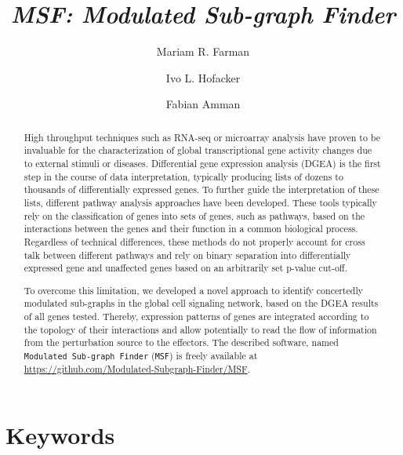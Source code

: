 \documentclass[10pt,a4paper,twocolumn]{article}
\begin{document}
\title{\textit{MSF: Modulated Sub-graph Finder} }

\author[1]{Mariam R. Farman}
\author[1]{Ivo L. Hofacker}
\author[1,2]{Fabian Amman}



\maketitle
\thispagestyle{fancy}

\begin{abstract}

High throughput techniques such as RNA-seq or microarray analysis have
proven to be invaluable for the characterization of global transcriptional
gene activity changes due to external stimuli or diseases. Differential
gene expression analysis (DGEA) is the first step in the course of data
interpretation, typically producing lists of dozens to thousands of
differentially expressed genes. To further guide the interpretation of
these lists, different pathway analysis approaches have been
developed. These tools typically rely on the classification of genes into
sets of genes, such as pathways, based on the interactions between the genes
and their function in a common biological process. Regardless of technical
differences, these methods do not properly account for cross talk between
different pathways and rely on binary separation into differentially
expressed gene and unaffected genes based on an arbitrarily set p-value
cut-off.

To overcome this limitation, we developed a novel approach to identify
concertedly modulated sub-graphs in the global cell signaling network,
based on the DGEA results of all genes tested. Thereby, expression patterns
of genes are integrated according to the topology of their interactions and
allow potentially to read the flow of information from the perturbation
source to the effectors. The described software, named \texttt{Modulated
  Sub-graph Finder} (\texttt{MSF}) is freely available at
\url{https://github.com/Modulated-Subgraph-Finder/MSF}.

\end{abstract}

\section*{Keywords}
\end{document}
